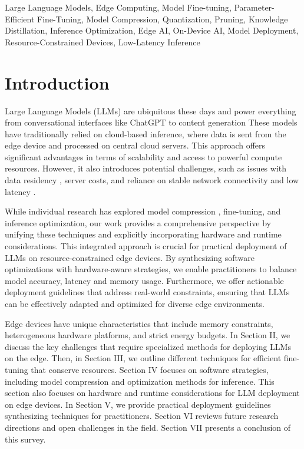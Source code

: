 \documentclass[11pt]{IEEEtran}
\begin{document}
\begin{IEEEkeywords}
Large Language Models, Edge Computing, Model Fine-tuning, Parameter-Efficient Fine-Tuning, Model Compression, Quantization, Pruning, Knowledge Distillation, Inference Optimization, Edge AI, On-Device AI, Model Deployment, Resource-Constrained Devices, Low-Latency Inference
\end{IEEEkeywords}

\section{Introduction}
Large Language Models (LLMs)\cite{b1} are ubiquitous these days and power everything from conversational interfaces like ChatGPT \cite{b2} to content generation \cite{b3,b4} These models have traditionally relied on cloud-based inference, where data is sent from the edge device and processed on central cloud servers. This approach offers significant advantages in terms of scalability and access to powerful compute resources. However, it also introduces potential challenges, such as issues with data residency \cite{b5}, server costs, and reliance on stable network connectivity and low latency \cite{b6}.

While individual research has explored model compression \cite{b45}, fine-tuning\cite{b59}, and inference optimization, our work provides a comprehensive perspective by unifying these techniques and explicitly incorporating hardware and runtime considerations. This integrated approach is crucial for practical deployment of LLMs on resource-constrained edge devices. By synthesizing software optimizations with hardware-aware strategies, we enable practitioners to balance model accuracy, latency and memory usage. Furthermore, we offer actionable deployment guidelines that address real-world constraints, ensuring that LLMs can be effectively adapted and optimized for diverse edge environments.

Edge devices have unique characteristics that include memory constraints, heterogeneous hardware platforms, and strict energy budgets. In Section II, we discuss the key challenges that require specialized methods for deploying LLMs on the edge. Then, in Section III, we outline different techniques for efficient fine-tuning that conserve resources. Section IV focuses on software strategies, including model compression and optimization methods for inference. This section also focuses on hardware and runtime considerations for LLM deployment on edge devices. In Section V, we provide practical deployment guidelines synthesizing techniques for practitioners. Section VI reviews future research directions and open challenges in the field. Section VII presents a conclusion of this survey.
\end{document}
